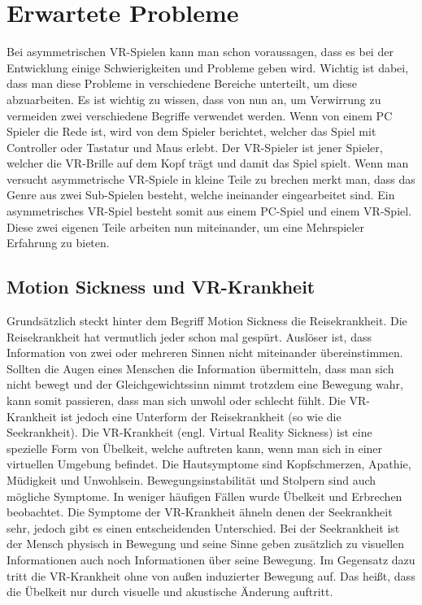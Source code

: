 \section{Erwartete Probleme}
Bei asymmetrischen VR-Spielen kann man schon voraussagen, dass es bei der Entwicklung einige Schwierigkeiten und Probleme geben wird. Wichtig ist dabei, dass man diese Probleme in verschiedene Bereiche unterteilt, um diese abzuarbeiten. Es ist wichtig zu wissen, dass von nun an, um Verwirrung zu vermeiden zwei verschiedene Begriffe verwendet werden. Wenn von einem PC Spieler die Rede ist, wird von dem Spieler berichtet, welcher das Spiel mit Controller oder Tastatur und Maus erlebt. Der VR-Spieler ist jener Spieler, welcher die VR-Brille auf dem Kopf trägt und damit das Spiel spielt. Wenn man versucht asymmetrische VR-Spiele in kleine Teile zu brechen merkt man, dass das Genre aus zwei Sub-Spielen besteht, welche ineinander eingearbeitet sind. Ein asymmetrisches VR-Spiel besteht somit aus einem PC-Spiel und einem VR-Spiel. Diese zwei eigenen Teile arbeiten nun miteinander, um eine Mehrspieler Erfahrung zu bieten.

\subsection{Motion Sickness und VR-Krankheit}
Grundsätzlich steckt hinter dem Begriff Motion Sickness die Reisekrankheit. Die Reisekrankheit hat vermutlich jeder schon mal gespürt. Auslöser ist, dass Information von zwei oder mehreren Sinnen nicht miteinander übereinstimmen. Sollten die Augen eines Menschen die Information übermitteln, dass man sich nicht bewegt und der Gleichgewichtssinn nimmt trotzdem eine Bewegung wahr, kann somit passieren, dass man sich unwohl oder schlecht fühlt. Die VR-Krankheit ist jedoch eine Unterform der Reisekrankheit (so wie die Seekrankheit).
Die VR-Krankheit (engl. Virtual Reality Sickness) ist eine spezielle Form von Übelkeit, welche auftreten kann, wenn man sich in einer virtuellen Umgebung befindet. Die Hautsymptome sind Kopfschmerzen, Apathie, Müdigkeit und Unwohlsein. Bewegungsinstabilität und Stolpern sind auch mögliche Symptome. In weniger häufigen Fällen wurde Übelkeit und Erbrechen beobachtet. Die Symptome der VR-Krankheit ähneln denen der Seekrankheit sehr, jedoch gibt es einen entscheidenden Unterschied. Bei der Seekrankheit ist der Mensch physisch in Bewegung und seine Sinne geben zusätzlich zu visuellen Informationen auch noch Informationen über seine Bewegung. Im Gegensatz dazu tritt die VR-Krankheit ohne von außen induzierter Bewegung auf. Das heißt, dass die Übelkeit nur durch visuelle und akustische Änderung auftritt.


